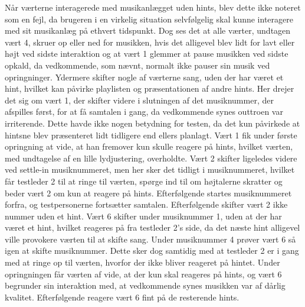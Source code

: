 Når værterne interagerede med musikanlægget uden hints, blev dette ikke noteret som en fejl, da brugeren i en virkelig situation selvfølgelig skal kunne interagere med sit musikanlæg på ethvert tidspunkt. Dog ses det at alle værter, undtagen vært 4, skruer op eller ned for musikken, hvis det alligevel blev lidt for lavt eller højt ved sidste interaktion og at vært 1 glemmer at pause musikken ved sidste opkald, da vedkommende, som nævnt, normalt ikke pauser sin musik ved opringninger. Ydermere skifter nogle af værterne sang, uden der har været et hint, hvilket kan påvirke playlisten og præsentationen af andre hints. Her drejer det sig om vært 1, der skifter videre i slutningen af det musiknummer, der afspilles først, for at få samtalen i gang, da vedkommende synes outtroen var irriterende. Dette havde ikke nogen betydning for testen, da det kun påvirkede at hintsne blev præsenteret lidt tidligere end ellers planlagt. Vært 1 fik under første opringning at vide, at han fremover kun skulle reagere på hints, hvilket værten, med undtagelse af en lille lydjustering, overholdte. Vært 2 skifter ligeledes videre ved settle-in musiknummeret, men her sker det tidligt i musiknummeret, hvilket får testleder 2 til at ringe til værten, spørge ind til om højtalerne skratter og beder vært 2 om kun at reagere på hints. Efterfølgende startes musiknummeret forfra, og testpersonerne fortsætter samtalen. Efterfølgende skifter vært 2 ikke nummer uden et hint. Vært 6 skifter under musiknummer 1, uden at der har været et hint, hvilket reageres på fra testleder 2's side, da det næste hint alligevel ville provokere værten til at skifte sang. Under musiknummer 4 prøver vært 6 så igen at skifte musiknummer. Dette sker dog samtidig med at testleder 2 er i gang med at ringe op til værten, hvorfor der ikke bliver reageret på hintet. Under opringningen får værten af vide, at der kun skal reageres på hints, og vært 6 begrunder sin interaktion med, at vedkommende synes musikken var af dårlig kvalitet. Efterfølgende reagere vært 6 fint på de resterende hints. 


